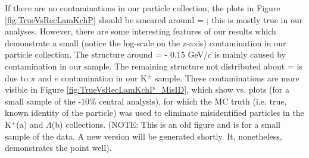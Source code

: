 \documentclass[../AnalysisNoteJBuxton.tex]{subfiles}
\begin{document}
If there are no contaminations in our particle collection, the plots in Figure \ref{fig:TrueVsRecLamKchP} should be smeared around \ktrue = \krec; this is mostly true in our analyses.
However, there are some interesting features of our results which demonstrate a small (notice the log-scale on the z-axis) contamination in our particle collection.
The structure around \krec = \ktrue - 0.15 GeV/$c$ is mainly caused by \Ks contamination in our \LamALam sample.
The remaining structure not distributed about \krec = \ktrue is due to $\pi$ and $e$ contamination in our K$^{\pm}$ sample.
These contaminations are more visible in Figure \ref{fig:TrueVsRecLamKchP_MisID}, which show \krec vs. \ktrue plots (for a small sample of the -10\% central analysis), for which the MC truth (i.e. true, known identity of the particle) was used to eliminate misidentified particles in the K$^{+}$(a) and $\Lambda$(b) collections. (NOTE: This is an old figure and is for a small sample of the data.  A new version will be generated shortly.  It, nonetheless, demonstrates the point well).
\end{document}

